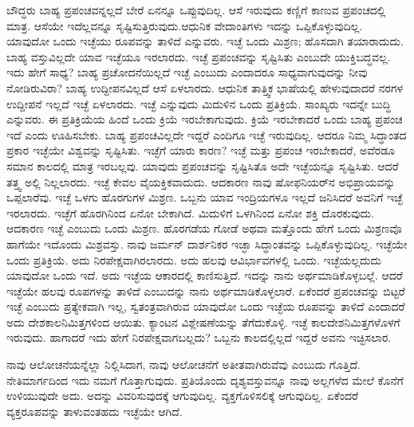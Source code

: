 ಬೌದ್ಧರು ಬಾಹ್ಯ ಪ್ರಪಂಚವನ್ನಲ್ಲದೆ ಬೇರೆ ಏನನ್ನೂ ಒಪ್ಪುವುದಿಲ್ಲ. ಆಸೆ ಇರುವುದು ಕಣ್ಣಿಗೆ ಕಾಣುವ ಪ್ರಪಂಚದಲ್ಲಿ ಮಾತ್ರ. ಆಸೆಯೇ ಇದೆಲ್ಲವನ್ನೂ ಸೃಷ್ಟಿಸುತ್ತಿರುವುದು.\break ಆಧುನಿಕ ವೇದಾಂತಿಗಳು ಇದನ್ನು ಒಪ್ಪಿಕೊಳ್ಳುವುದಿಲ್ಲ. ಯಾವುದೋ ಒಂದು ಇಚ್ಛೆಯು ರೂಪವನ್ನು ತಾಳಿದೆ ಎನ್ನುವರು. ಇಚ್ಛೆ ಒಂದು ಮಿಶ್ರಣ; ಹೊಸದಾಗಿ ತಯಾರಾದುದು. ಬಾಹ್ಯ ವಸ್ತುವಿಲ್ಲದೇ ಯಾವ ಇಚ್ಛೆಯೂ ಇರಲಾರದು. ಇಚ್ಛೆ ಪ್ರಪಂಚವನ್ನು ಸೃಷ್ಟಿಸಿತು ಎಂಬುದೇ ಯುಕ್ತಿಬದ್ಧವಲ್ಲ. ಇದು ಹೇಗೆ ಸಾಧ್ಯ? ಬಾಹ್ಯ ಪ್ರಚೋದನೆಯಿಲ್ಲದೆ ಇಚ್ಛೆ ಎಂಬುದು ಎಂದಾದರೂ ಸಾಧ್ಯವಾಗುವುದನ್ನು ನೀವು ನೋಡಿರುವಿರಾ? ಬಾಹ್ಯ ಉದ್ದೀಪನವಿಲ್ಲದೆ ಆಸೆ ಏಳಲಾರದು. ಆಧುನಿಕ ತಾತ್ತ್ವಿಕ ಭಾಷೆಯಲ್ಲಿ ಹೇಳುವುದಾದರೆ ನರಗಳ ಉದ್ದೀಪನೆ ಇಲ್ಲದೆ ಇಚ್ಛೆ ಏಳಲಾರದು. ಇಚ್ಛೆ ಎನ್ನುವುದು ಮಿದುಳಿನ ಒಂದು ಪ್ರತಿಕ್ರಿಯೆ. ಸಾಂಖ್ಯರು ಇದನ್ನೇ ಬುದ್ಧಿ ಎನ್ನುವರು. ಈ ಪ್ರತಿಕ್ರಿಯೆಯ ಹಿಂದೆ ಒಂದು ಕ್ರಿಯೆ ಇರಬೇಕಾಗುವುದು. ಕ್ರಿಯೆ ಇರಬೇಕಾದರೆ ಒಂದು ಬಾಹ್ಯ ಪ್ರಪಂಚ ಇದೆ ಎಂದು ಊಹಿಸಬೇಕು. ಬಾಹ್ಯ ಪ್ರಪಂಚವಿಲ್ಲದೇ ಇದ್ದರೆ ಎಂದಿಗೂ ಇಚ್ಛೆ ಇರುವುದಿಲ್ಲ. ಆದರೂ ನಿಮ್ಮ ಸಿದ್ಧಾಂತದ ಪ್ರಕಾರ ಇಚ್ಛೆಯೇ ವಿಶ್ವವನ್ನು ಸೃಷ್ಟಿಸಿತು. ಇಚ್ಛೆಗೆ ಯಾರು ಕಾರಣ? ಇಚ್ಛೆ ಮತ್ತು ಪ್ರಪಂಚ ಇರಬೇಕಾದರೆ, ಅವೆರಡೂ ಸಮಾನ ಕಾಲದಲ್ಲಿ ಮಾತ್ರ ಇರಬಲ್ಲವು. ಯಾವುದು ಪ್ರಪಂಚವನ್ನು ಸೃಷ್ಟಿಸಿತೊ ಅದೇ ಇಚ್ಛೆಯನ್ನೂ ಸೃಷ್ಟಿಸಿತು. ಆದರೆ ತತ್ತ್ವ ಅಲ್ಲಿ ನಿಲ್ಲಲಾರದು. ಇಚ್ಛೆ ಕೇವಲ ವೈಯಕ್ತಿಕವಾದುದು. ಆದಕಾರಣ ನಾವು ಷೋಫನಿಯರ್​ನ ಅಭಿಪ್ರಾಯವನ್ನು ಒಪ್ಪಲಾರೆವು. ಇಚ್ಛೆ ಒಳಗು ಹೊರಗುಗಳ ಮಿಶ್ರಣ. ಒಬ್ಬನು ಯಾವ ಇಂದ್ರಿಯಗಳೂ ಇಲ್ಲದೆ ಜನಿಸಿದರೆ ಅವನಿಗೆ ಇಚ್ಛೆ ಇರಲಾರದು. ಇಚ್ಛೆಗೆ ಹೊರಗಿನಿಂದ ಏನೋ ಬೇಕಾಗಿದೆ. ಮಿದುಳಿಗೆ ಒಳಗಿನಿಂದ ಏನೋ ಶಕ್ತಿ ದೊರಕುವುದು. ಆದಕಾರಣ ಇಚ್ಛೆ ಎಂಬುದು ಒಂದು ಮಿಶ್ರಣ. ಹೊರಗಡೆಯ ಗೋಡೆ ಅಥವಾ ಮತ್ತೊಂದು ಹೇಗೆ ಒಂದು ಮಿಶ್ರಣವೊ ಹಾಗೆಯೇ ಇದೊಂದು ಮಿಶ್ರವಸ್ತು. ನಾವು ಜರ್ಮನ್​ ದಾರ್ಶನಿಕರ ಇಚ್ಛಾ ಸಿದ್ಧಾಂತವನ್ನು ಒಪ್ಪಿಕೊಳ್ಳುವುದಿಲ್ಲ. ಇಚ್ಛೆಯೇ ಒಂದು ಪ್ರತಿಕ್ರಿಯೆ. ಅದು ನಿರಪೇಕ್ಷವಾಗಿರಲಾರದು. ಅದು ಹಲವು ಆವಿರ್ಭಾವಗಳಲ್ಲಿ ಒಂದು. ಇಚ್ಛೆಯಲ್ಲದುದು ಯಾವುದೋ ಒಂದು ಇದೆ. ಅದು ಇಚ್ಛೆಯ ಆಕಾರದಲ್ಲಿ ಕಾಣಿಸುತ್ತಿದೆ. ಇದನ್ನು ನಾನು ಅರ್ಥಮಾಡಿಕೊಳ್ಳಬಲ್ಲೆ. ಆದರೆ ಇಚ್ಛೆಯೇ ಹಲವು ರೂಪಗಳನ್ನು ತಾಳಿದೆ ಎಂಬುದನ್ನು ನಾನು ಅರ್ಥಮಾಡಿಕೊಳ್ಳಲಾರೆ. ಏಕೆಂದರೆ ಪ್ರಪಂಚವನ್ನು ಬಿಟ್ಟರೆ ಇಚ್ಛೆ ಎಂಬುದು ಪ್ರತ್ಯೇಕವಾಗಿ ಇಲ್ಲ, ಸ್ವತಂತ್ರವಾಗಿರುವ ಯಾವುದೋ ಒಂದು ಇಚ್ಛೆಯ ರೂಪವನ್ನು ತಾಳಿದೆ ಎಂದಾದರೆ ಅದು ದೇಶಕಾಲನಿಮಿತ್ತಗಳಿಂದ ಆಯಿತು. ಕ್ಯಾಂಟನ ವಿಶ್ಲೇಷಣೆಯನ್ನು ತೆಗೆದುಕೊಳ್ಳಿ. ಇಚ್ಛೆ ಕಾಲದೇಶನಿಮಿತ್ತಗಳೊಳಗೆ ಇರುವುದು. ಹಾಗಾದರೆ ಇದು ಹೇಗೆ ನಿರಪೇಕ್ಷವಾಗಬಲ್ಲದು? ಒಬ್ಬನು ಕಾಲದಲ್ಲಿಲ್ಲದೆ ಇದ್ದರೆ ಅವನು ಇಚ್ಛಿಸಲಾರ.

ನಾವು ಆಲೋಚನೆಯನ್ನೆಲ್ಲಾ ನಿಲ್ಲಿಸಿದಾಗ, ನಾವು ಆಲೋಚನೆಗೆ ಅತೀತವಾಗಿರುವೆವು ಎಂಬುದು ಗೊತ್ತಿದೆ. ನೇತಿಮಾರ್ಗದಿಂದ ಇದು ನಮಗೆ ಗೊತ್ತಾಗುವುದು. ಪ್ರತಿಯೊಂದು ದೃಶ್ಯವಸ್ತುವನ್ನೂ ನಾವು ಅಲ್ಲಗಳೆದ ಮೇಲೆ ಕೊನೆಗೆ ಉಳಿಯುವುದೇ ಅದು. ಅದನ್ನು ವಿವರಿಸುವುದಕ್ಕೆ ಆಗುವುದಿಲ್ಲ. ವ್ಯಕ್ತಗೊಳಿಸಲಿಕ್ಕೆ ಆಗುವುದಿಲ್ಲ. ಏಕೆಂದರೆ ವ್ಯಕ್ತರೂಪವನ್ನು ತಾಳುವಂತಹದು ಇಚ್ಛೆಯೇ ಆಗಿದೆ.

